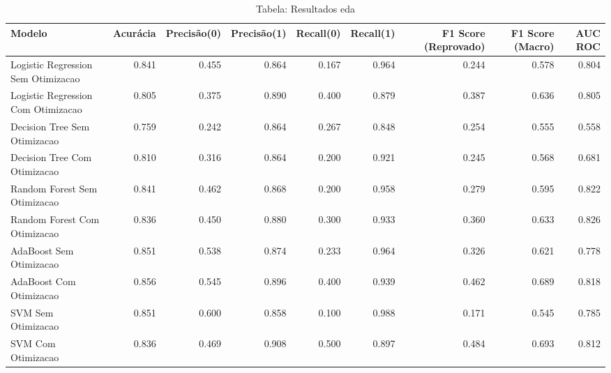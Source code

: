 \begin{table}[H] %
    \centering
    \caption{Tabela: Resultados eda}
    \label{tab:resultados_eda}
    \renewcommand{\arraystretch}{1.25} %
    \begin{adjustwidth}{ -1in }{ -1in } %
    \centering %
    \small %
    \begin{tabular}{lrrrrrrrr}
\toprule
                            Modelo &  Acurácia &  Precisão(0) &  Precisão(1) &  Recall(0) &  Recall(1) &  F1 Score (Reprovado) &  F1 Score (Macro) &  AUC ROC \\
\midrule
Logistic Regression Sem Otimizacao &     0.841 &        0.455 &        0.864 &      0.167 &      0.964 &                 0.244 &             0.578 &    0.804 \\
Logistic Regression Com Otimizacao &     0.805 &        0.375 &        0.890 &      0.400 &      0.879 &                 0.387 &             0.636 &    0.805 \\
      Decision Tree Sem Otimizacao &     0.759 &        0.242 &        0.864 &      0.267 &      0.848 &                 0.254 &             0.555 &    0.558 \\
      Decision Tree Com Otimizacao &     0.810 &        0.316 &        0.864 &      0.200 &      0.921 &                 0.245 &             0.568 &    0.681 \\
      Random Forest Sem Otimizacao &     0.841 &        0.462 &        0.868 &      0.200 &      0.958 &                 0.279 &             0.595 &    0.822 \\
      Random Forest Com Otimizacao &     0.836 &        0.450 &        0.880 &      0.300 &      0.933 &                 0.360 &             0.633 &    0.826 \\
           AdaBoost Sem Otimizacao &     0.851 &        0.538 &        0.874 &      0.233 &      0.964 &                 0.326 &             0.621 &    0.778 \\
           AdaBoost Com Otimizacao &     0.856 &        0.545 &        0.896 &      0.400 &      0.939 &                 0.462 &             0.689 &    0.818 \\
                SVM Sem Otimizacao &     0.851 &        0.600 &        0.858 &      0.100 &      0.988 &                 0.171 &             0.545 &    0.785 \\
                SVM Com Otimizacao &     0.836 &        0.469 &        0.908 &      0.500 &      0.897 &                 0.484 &             0.693 &    0.812 \\
\bottomrule
\end{tabular}
    \end{adjustwidth}
    \renewcommand{\arraystretch}{1.0} %
\end{table}

